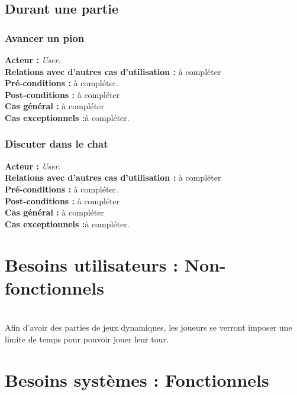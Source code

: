 \documentclass[10pt, a4paper]{article}
\begin{document}
\subsection{Durant une partie}

\subsubsection{Avancer un pion}
\textbf{Acteur :} \textit{User}.\\
\textbf{Relations avec d'autres cas d'utilisation :} à compléter\\
\textbf{Pré-conditions :} à compléter.\\
\textbf{Post-conditions :} à compléter\\
\textbf{Cas général :} à compléter\\
\textbf{Cas exceptionnels :}à compléter.

\subsubsection{Discuter dans le chat}
\textbf{Acteur :} \textit{User}.\\
\textbf{Relations avec d'autres cas d'utilisation :} à compléter\\
\textbf{Pré-conditions :} à compléter.\\
\textbf{Post-conditions :} à compléter\\
\textbf{Cas général :} à compléter\\
\textbf{Cas exceptionnels :}à compléter.

\section{Besoins utilisateurs : Non-fonctionnels}\\
Afin d'avoir des parties de jeux dynamiques, les joueurs se verront imposer une limite de temps pour pouvoir jouer leur tour. \\
		
\section{Besoins systèmes : Fonctionnels}
\end{document}
